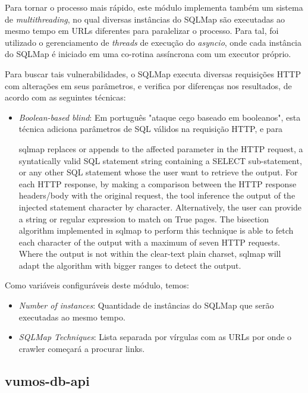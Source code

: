     Para tornar o processo mais rápido, este módulo implementa também um sistema de \textit{multithreading}, no qual diversas instâncias do SQLMap são executadas ao mesmo tempo em URLs diferentes para paralelizar o processo. Para tal, foi utilizado o gerenciamento de \textit{threads} de execução do \textit{asyncio}, onde cada instância do SQLMap é iniciado em uma co-rotina assíncrona com um executor próprio.
    
    Para buscar tais vulnerabilidades, o SQLMap executa diversas requisições HTTP com alterações em seus parâmetros, e verifica por diferenças nos resultados, de acordo com as seguintes técnicas:
    
    \begin{itemize}
        \item \emph{Boolean-based blind}: Em português "ataque cego baseado em booleanos", esta técnica adiciona parâmetros de SQL válidos na requisição HTTP, e para 
        
        sqlmap replaces or appends to the affected parameter in the HTTP request, a syntatically valid SQL statement string containing a SELECT sub-statement, or any other SQL statement whose the user want to retrieve the output. For each HTTP response, by making a comparison between the HTTP response headers/body with the original request, the tool inference the output of the injected statement character by character. Alternatively, the user can provide a string or regular expression to match on True pages. The bisection algorithm implemented in sqlmap to perform this technique is able to fetch each character of the output with a maximum of seven HTTP requests. Where the output is not within the clear-text plain charset, sqlmap will adapt the algorithm with bigger ranges to detect the output.
    \end{itemize}
    
    Como variáveis configuráveis deste módulo, temos:
    \begin{itemize}
        \item \emph{Number of instances}: Quantidade de instâncias do SQLMap que serão executadas ao mesmo tempo.
        \item \emph{SQLMap Techniques}: Lista separada por vírgulas com as URLs por onde o crawler começará a procurar links. 
    \end{itemize}


    \subsection{vumos-db-api}
